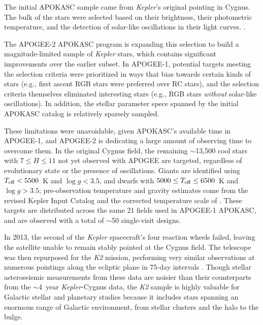 \documentclass[12pt,twocolumn]{emulateapj}
\begin{document}
The initial APOKASC sample came from {\it Kepler}'s original pointing in Cygnus.  The bulk of the stars were selected based on their brightness, their photometric temperature, and the detection of solar-like oscillations in their light curves.  \citep[For details of the rest of the Cygnus APOKASC targets, see \S8.3 in][]{Zasowski_2013_apogeetargeting}. 

The APOGEE-2 APOKASC program is expanding this selection to build a magnitude-limited sample of {\it Kepler} stars, which contains significant improvements over the earlier subset.  In APOGEE-1, potential targets meeting the selection criteria were prioritized in ways that bias towards certain kinds of stars (e.g., first ascent RGB stars were preferred over RC stars), and the selection criteria themselves eliminated interesting stars (e.g., RGB stars {\it without} solar-like oscillations).  In addition, the stellar parameter spece spanned by the initial APOKASC catalog is relatively sparsely sampled.  

These limitations were unavoidable, given APOKASC's available time in APOGEE-1, and APOGEE-2 is dedicating a large amount of observing time to overcome them.  In the original Cygnus field, the remaining $\sim$13,500 cool stars with $7 \leq H \leq 11$ not yet observed with APOGEE are targeted, regardless of evolutionary state or the presence of oscillations.  Giants are identified using $T_{\rm eff} < 5500$~K and $\log{g} < 3.5$, and dwarfs with $5000 \leq T_{\rm eff} \leq 6500$~K and $\log{g} > 3.5$; pre-observation temperature and gravity estimates come from the revised Kepler Input Catalog \citep{Huber_2014_revisedKIC} and the corrected temperature scale of \citet{Pinsonneault_2012_KICTeffrevision}.  These targets are distributed across the same 21 fields used in APOGEE-1 APOKASC, and are observed with a total of $\sim$50 single-visit designs.

In 2013, the second of the {\it Kepler} spacecraft's four reaction wheels failed, leaving the satellite unable to remain stably pointed at the Cygnus field.  The telescope was then repurposed for the {\it K2} mission, performing very similar observations at numerous pointings along the ecliptic plane in 75-day intervals \citep{Howell_2014_K2}.  Though stellar asteroseismic measurements from these data are noisier than their counterparts from the $\sim$4~year {\it Kepler}-Cygnus data, the {\it K2} sample is highly valuable for Galactic stellar and planetary studies because it includes stars spanning an enormous range of Galactic environment, from stellar clusters and the halo to the bulge.  
\end{document}
